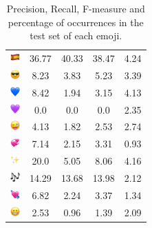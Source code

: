 \documentclass{article}
\begin{document}
\begin{table}
\begin{tabular}{|c|ccc|c|}
\includegraphics[height=0.37cm,width=0.37cm]{img/Spain.png} & 36.77 & 40.33 & 38.47 & 4.24\\ 
\includegraphics[height=0.37cm,width=0.37cm]{img/smiling_face_with_sunglasses.png} & 8.23 & 3.83 & 5.23 & 3.39\\ 
\includegraphics[height=0.37cm,width=0.37cm]{img/blue_heart.png} & 8.42 & 1.94 & 3.15 & 4.13\\ 
\includegraphics[height=0.37cm,width=0.37cm]{img/purple_heart.png} & 0.0 & 0.0 & 0.0 & 2.35\\ 
\includegraphics[height=0.37cm,width=0.37cm]{img/winking_face_with_tongue.png} & 4.13 & 1.82 & 2.53 & 2.74\\ 
\includegraphics[height=0.37cm,width=0.37cm]{img/revolving_hearts.png} & 7.14 & 2.15 & 3.31 & 0.93\\ 
\includegraphics[height=0.37cm,width=0.37cm]{img/sparkles.png} & 20.0 & 5.05 & 8.06 & 4.16\\ 
\includegraphics[height=0.37cm,width=0.37cm]{img/musical_notes.png} & 14.29 & 13.68 & 13.98 & 2.12\\ 
\includegraphics[height=0.37cm,width=0.37cm]{img/heart_with_arrow.png} & 6.82 & 2.24 & 3.37 & 1.34\\ 
\includegraphics[height=0.37cm,width=0.37cm]{img/beaming_face_with_smiling_eyes.png} & 2.53 & 0.96 & 1.39 & 2.09\\ 

\hline
\end{tabular}
\caption{\label{table:emoji_detailed} Precision, Recall, F-measure and percentage of occurrences in the test set of each emoji.}
\end{table}
\end{document}
